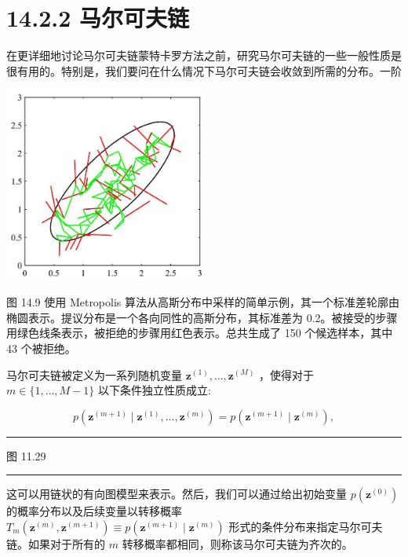 \documentclass[10pt]{report}
\newcommand{\HRule}{\begin{center}\rule{0.9\linewidth}{0.2mm}\end{center}}
\begin{document}
\section*{14.2.2 马尔可夫链}

在更详细地讨论马尔可夫链蒙特卡罗方法之前，研究马尔可夫链的一些一般性质是很有用的。特别是，我们要问在什么情况下马尔可夫链会收敛到所需的分布。一阶

\begin{center}
\includegraphics[max width=0.5\textwidth]{images/0194e279-9b28-703a-88f4-c3ac21e2010d_462_923_365_621_597_0.jpg}
\end{center}
\hspace*{3em} 

图 14.9 使用 Metropolis 算法从高斯分布中采样的简单示例，其一个标准差轮廓由椭圆表示。提议分布是一个各向同性的高斯分布，其标准差为 0.2。被接受的步骤用绿色线条表示，被拒绝的步骤用红色表示。总共生成了 150 个候选样本，其中 43 个被拒绝。

马尔可夫链被定义为一系列随机变量 \({\mathbf{z}}^{\left( 1\right) },\ldots ,{\mathbf{z}}^{\left( M\right) }\) ，使得对于 \(m \in  \{ 1,\ldots ,M - 1\}\) 以下条件独立性质成立:

\[
p\left( {{\mathbf{z}}^{\left( m + 1\right) } \mid  {\mathbf{z}}^{\left( 1\right) },\ldots ,{\mathbf{z}}^{\left( m\right) }}\right)  = p\left( {{\mathbf{z}}^{\left( m + 1\right) } \mid  {\mathbf{z}}^{\left( m\right) }}\right) , \tag{14.31}
\]

\HRule

图 11.29

\HRule

这可以用链状的有向图模型来表示。然后，我们可以通过给出初始变量 \(p\left( {\mathbf{z}}^{\left( 0\right) }\right)\) 的概率分布以及后续变量以转移概率 \({T}_{m}\left( {{\mathbf{z}}^{\left( m\right) },{\mathbf{z}}^{\left( m + 1\right) }}\right)  \equiv  p\left( {{\mathbf{z}}^{\left( m + 1\right) } \mid  {\mathbf{z}}^{\left( m\right) }}\right)\) 形式的条件分布来指定马尔可夫链。如果对于所有的 \(m\) 转移概率都相同，则称该马尔可夫链为齐次的。
\end{document}
